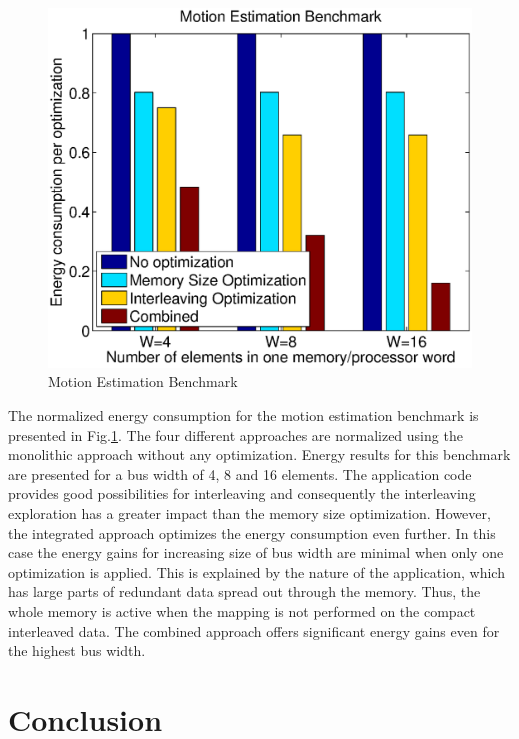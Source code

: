 \documentclass[prodmode,acmtecs]{acmsmall}
\begin{document}
\begin{figure}
\centering
	\includegraphics[scale = 0.5]{Images/mest.eps} 
	\caption{Motion Estimation Benchmark}
	\label{fig:mest}
\end{figure}

The normalized energy consumption for the motion estimation benchmark is presented in Fig.\ref{fig:mest}.
The four different approaches are normalized using the monolithic approach without any optimization.
Energy results for this benchmark are presented for a bus width of 4, 8 and 16 elements.
The application code provides good possibilities for interleaving and consequently the interleaving exploration has a greater impact than the memory size optimization.
However, the integrated approach optimizes the energy consumption even further.
In this case the energy gains for increasing size of bus width are minimal when only one optimization is applied.
This is explained by the nature of the application, which has large parts of redundant data spread out through the memory.
Thus, the whole memory is active when the mapping is not performed on the compact interleaved data.
The combined approach offers significant energy gains even for the highest bus width. 

\section{Conclusion}
\label{sec:conclusion}
\end{document}
